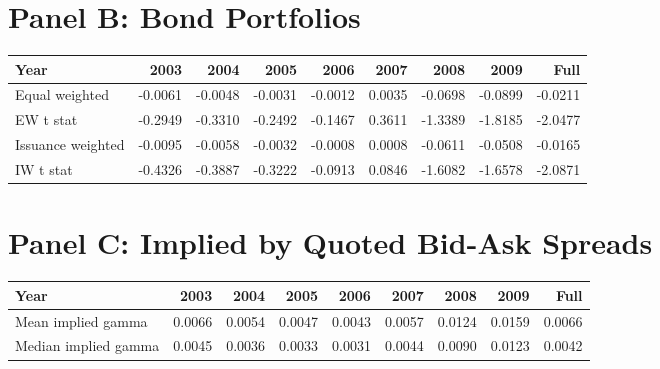 \documentclass{article}
\begin{document}
\section*{Panel B: Bond Portfolios}
\begin{center}
\begin{tabular}{l|rrrrrrrr}
\toprule
Year & 2003 & 2004 & 2005 & 2006 & 2007 & 2008 & 2009 & Full \\
\midrule
Equal weighted & -0.0061 & -0.0048 & -0.0031 & -0.0012 & 0.0035 & -0.0698 & -0.0899 & -0.0211 \\
EW t stat & -0.2949 & -0.3310 & -0.2492 & -0.1467 & 0.3611 & -1.3389 & -1.8185 & -2.0477 \\
Issuance weighted & -0.0095 & -0.0058 & -0.0032 & -0.0008 & 0.0008 & -0.0611 & -0.0508 & -0.0165 \\
IW t stat & -0.4326 & -0.3887 & -0.3222 & -0.0913 & 0.0846 & -1.6082 & -1.6578 & -2.0871 \\
\bottomrule
\end{tabular}

\end{center}

\section*{Panel C: Implied by Quoted Bid-Ask Spreads}
\begin{center}
\begin{tabular}{l|rrrrrrrr}
\toprule
Year & 2003 & 2004 & 2005 & 2006 & 2007 & 2008 & 2009 & Full \\
\midrule
Mean implied gamma & 0.0066 & 0.0054 & 0.0047 & 0.0043 & 0.0057 & 0.0124 & 0.0159 & 0.0066 \\
Median implied gamma & 0.0045 & 0.0036 & 0.0033 & 0.0031 & 0.0044 & 0.0090 & 0.0123 & 0.0042 \\
\bottomrule
\end{tabular}

\end{center}
\end{document}
